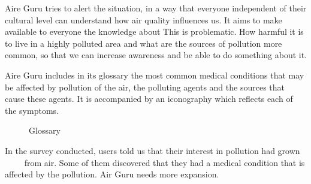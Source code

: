 Aire Guru tries to alert the situation, in a way that everyone independent of their cultural level
can understand how air quality influences us. It aims to make available to everyone the knowledge about
This is problematic. How harmful it is to live in a highly polluted area and what are the sources of pollution
more common, so that we can increase awareness and be able to do something about it.


Aire Guru includes in its glossary the most common medical conditions that may be affected by pollution
of the air, the polluting agents and the sources that cause these agents. It is accompanied by an iconography
which reflects each of the symptoms. \\

\begin{figure}[ht]
    \centering
    \hfill
  
  \caption{Glossary}
    \end{figure}
\begin{itemize}
    \done In the survey conducted, users told us that their interest in pollution had grown
         from air. Some of them discovered that they had a medical condition that is affected by the pollution.
    \crossed Air Guru needs more expansion.
    
\end{itemize}
\newpage